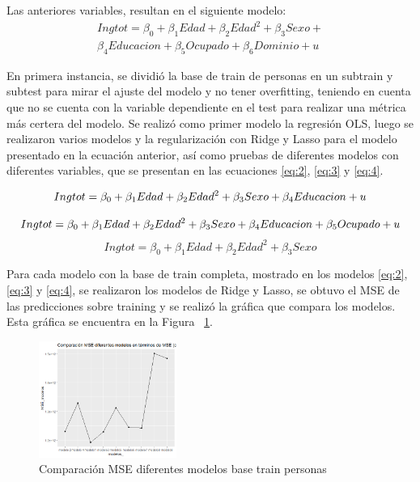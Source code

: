 \documentclass[conference, 10pt]{IEEEtran}
\begin{document}
Las anteriores variables, resultan en el siguiente modelo:\\
\begin{multline*}
Ingtot= \beta_{0}+\beta_{1}Edad+\beta_{2}Edad^{2}+\beta_{3}Sexo+\\
\beta_{4}Educacion+\beta_{5}Ocupado+\beta_{6}Dominio+u 
\end{multline*}

En primera instancia, se dividió la base de train de personas en un subtrain y subtest para mirar el ajuste del modelo y no tener overfitting, teniendo en cuenta que no se cuenta con la variable dependiente en el test para realizar una métrica más certera del modelo. Se realizó como primer modelo la regresión OLS, luego se realizaron varios modelos y la regularización con Ridge y Lasso para el modelo presentado en la ecuación anterior, así como pruebas de diferentes modelos con diferentes variables, que se presentan en las ecuaciones \eqref{eq:2}, \eqref{eq:3} y \eqref{eq:4}.


\begin{equation}
Ingtot= \beta_{0}+\beta_{1}Edad+\beta_{2}Edad^{2}+\beta_{3}Sexo+\\
\beta_{4}Educacion+u \label{eq:2}
\end{equation}

\begin{equation}
Ingtot= \beta_{0}+\beta_{1}Edad+\beta_{2}Edad^{2}+\beta_{3}Sexo+\\
\beta_{4}Educacion+\beta_{5}Ocupado+u \label{eq:3}
\end{equation}
\begin{equation}
Ingtot= \beta_{0}+\beta_{1}Edad+\beta_{2}Edad^{2}+\beta_{3}Sexo\label{eq:4}
\end{equation}

Para cada modelo con la base de train completa, mostrado en los modelos \eqref{eq:2}, \eqref{eq:3} y \eqref{eq:4}, se realizaron los modelos de Ridge y Lasso, se obtuvo el MSE de las predicciones sobre training y se realizó la gráfica que compara los modelos. Esta gráfica se encuentra en la Figura ~\ref{fig1}.  

\begin{figure}[htbp]
\centerline{\includegraphics[width=0.4\textwidth]{../Vistas/MSE_base_training.png}}
\caption{Comparación MSE diferentes modelos base train personas}
\label{fig1}
\end{figure}
\end{document}
